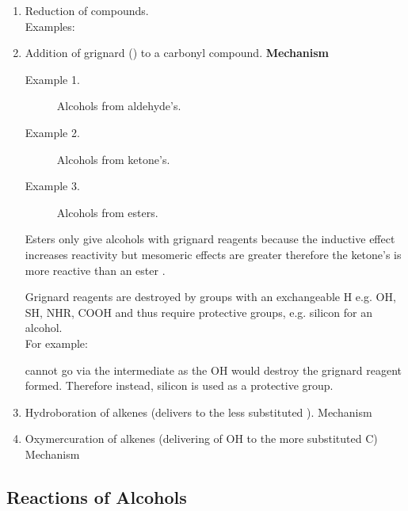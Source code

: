 \begin{enumerate}

	\item Reduction of  compounds.\\
		Examples:

	\item Addition of grignard () to a carbonyl compound.
		\textbf{Mechanism}

		\begin{description}
			\item[Example 1.] Alcohols from aldehyde's.\\

			\item[Example 2.] Alcohols from ketone's.\\

			\item[Example 3.] Alcohols from esters.\\
		\end{description}

		Esters only give alcohols with grignard reagents because the inductive
		effect increases reactivity but mesomeric effects are greater therefore
		the ketone's  is more reactive than an ester .


		Grignard reagents are destroyed by groups with an exchangeable H e.g. OH,
		SH, NHR, COOH and thus require protective groups, e.g. silicon for an
		alcohol.\\

		For example:

		 cannot go via the intermediate
		 as the OH would destroy the
		grignard reagent formed. Therefore instead, silicon is used as a protective group.


	\item Hydroboration of alkenes (delivers  to the less substituted
		).
		Mechanism

	\item Oxymercuration of alkenes (delivering of OH to the more substituted C)
		Mechanism

\end{enumerate}

\subsection{Reactions of Alcohols}

